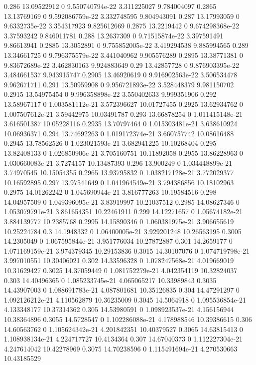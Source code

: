 {0.286 13.09522912 0 9.550740794e-22 3.311225027 9.784004097
0.2865 13.13769169 0 9.592086759e-22 3.332748595 9.804943091
0.287 13.17993059 0 9.6332735e-22 3.354317923 9.825612669
0.2875 13.2219442 0 9.674298368e-22 3.37593242 9.846011781
0.288 13.2637309 0 9.71515874e-22 3.397591491 9.86613941
0.2885 13.3052891 0 9.755852005e-22 3.419294538 9.885994565
0.289 13.34661725 0 9.796375579e-22 3.441040962 9.905576289
0.2895 13.38771381 0 9.83672689e-22 3.462830163 9.924883649
0.29 13.42857728 0 9.876903395e-22 3.484661537 9.943915747
0.2905 13.46920619 0 9.916902563e-22 3.506534478 9.962671711
0.291 13.50959908 0 9.956721893e-22 3.528448379 9.981150702
0.2915 13.54975454 0 9.996358898e-22 3.550402633 9.999351906
0.292 13.58967117 0 1.003581112e-21 3.572396627 10.01727455
0.2925 13.62934762 0 1.007507612e-21 3.59442975 10.03491787
0.293 13.66878254 0 1.011415148e-21 3.616501387 10.05228116
0.2935 13.70797464 0 1.015303481e-21 3.638610924 10.06936371
0.294 13.74692263 0 1.019172374e-21 3.660757742 10.08616488
0.2945 13.78562526 0 1.023021593e-21 3.682941225 10.10268404
0.295 13.82408133 0 1.026850906e-21 3.705160751 10.11892058
0.2955 13.86228963 0 1.030660083e-21 3.7274157 10.13487393
0.296 13.900249 0 1.034448899e-21 3.74970545 10.15054355
0.2965 13.93795832 0 1.038217128e-21 3.772029377 10.16592895
0.297 13.97541649 0 1.041964549e-21 3.794386856 10.18102963
0.2975 14.01262242 0 1.045690944e-21 3.816777263 10.19584516
0.298 14.04957509 0 1.049396095e-21 3.83919997 10.21037512
0.2985 14.08627346 0 1.053079791e-21 3.861654351 10.22461911
0.299 14.12271657 0 1.05674182e-21 3.884139777 10.2385768
0.2995 14.15890346 0 1.060381975e-21 3.906655619 10.25224784
0.3 14.1948332 0 1.06400005e-21 3.929201248 10.26563195
0.3005 14.2305049 0 1.067595844e-21 3.951776034 10.27872887
0.301 14.2659177 0 1.071169159e-21 3.974379345 10.29153836
0.3015 14.30107076 0 1.074719798e-21 3.997010551 10.30406021
0.302 14.33596328 0 1.078247568e-21 4.019669019 10.31629427
0.3025 14.37059449 0 1.081752279e-21 4.042354119 10.32824037
0.303 14.40496365 0 1.085233745e-21 4.065065217 10.33989843
0.3035 14.43907003 0 1.088691783e-21 4.087801681 10.35126835
0.304 14.47291297 0 1.092126212e-21 4.110562879 10.36235009
0.3045 14.5064918 0 1.095536854e-21 4.133348177 10.37314362
0.305 14.53980591 0 1.098923537e-21 4.156156944 10.38364896
0.3055 14.5728547 0 1.102286088e-21 4.178988546 10.39386615
0.306 14.60563762 0 1.105624342e-21 4.201842351 10.40379527
0.3065 14.63815413 0 1.108938134e-21 4.224717727 10.4134364
0.307 14.67040373 0 1.112227304e-21 4.247614042 10.42278969
0.3075 14.70238596 0 1.115491694e-21 4.270530663 10.43185529
}
